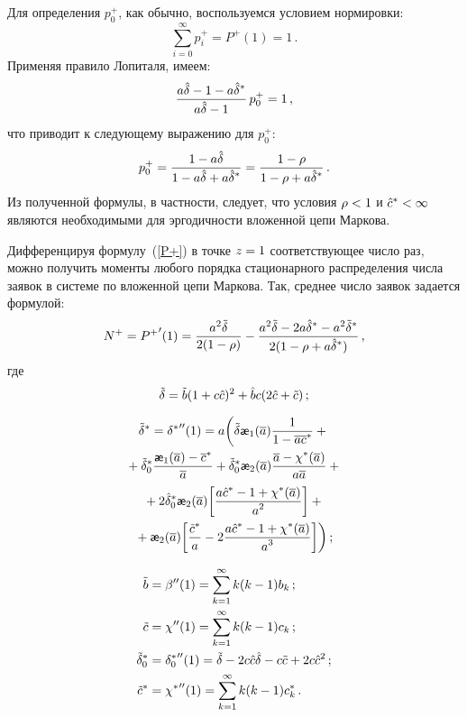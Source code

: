 \begin{multicols}{2}
Для определения $p^{+}_{0}$, как обычно, воспользуемся условием
нормировки:
$$
\sum\limits_{i=0}^{\infty} p^{+}_{i}=P^{+}(1)=1\,.
$$
Применяя правило Лопиталя, имеем:
\begin{equation*}
\displaystyle\frac{\displaystyle a\hat \delta - 1 - a\hat \delta^{*} \mathstrut}{\displaystyle  a\hat \delta - 1\mathstrut}\, p^{+}_{0} = 1\,,
\end{equation*}
что приводит к следующему выражению для $p^{+}_{0}$:
\begin{equation*}
\label{p0+}
p^{+}_{0} = \displaystyle\frac{\displaystyle 1-a\hat \delta \mathstrut}{\displaystyle 1-a\hat \delta+a \hat \delta^*\mathstrut} = \displaystyle\frac{\displaystyle 1-\rho \mathstrut}{\displaystyle 1-\rho+a\hat \delta^*\mathstrut}\,.
\end{equation*}
Из полученной формулы, в частности, следует, что условия
$\rho \hm<1$ и $\hc^*\hm<\infty$ являются необходимыми
для эргодичности вложенной цепи Маркова.

Дифференцируя формулу~(\ref{P+}) в точке $z\hm=1$
соответствующее число раз, можно получить моменты любого
порядка стационарного распределения чис\-ла заявок в системе
по вложенной цепи Маркова.
Так, среднее число заявок задается формулой:
\begin{equation*}
N^+ = {P^{+}}'(1) = \displaystyle\frac{\displaystyle a^2\tilde \delta \mathstrut}{\displaystyle 2(1 - \rho)\mathstrut}
- \displaystyle\frac{\displaystyle  a^2\tilde \delta  - 2a\hat \delta^*-a^2\tilde \delta^*\mathstrut}{\displaystyle 2(1 - \rho + a \hat \delta^*)\mathstrut}\,,
\end{equation*}
где
$$
\tilde \delta = \tilde b (1 + c \hat c)^2 + \hat b c(2\hat c+\tilde c)\,;
$$

\vspace*{-12pt}

\noindent
\begin{multline*}
\td^* = {\delta^*}''(1) = a \bigg(
\td {\slae}_{1}(\a) \fr{1}{1 - \a \oc^*}
+ {}\\
{}+\td_0^* \fr{{\slae}_{1}(\a) - \oc^* }{\a}
+ \td_0^* {\slae}_{2}(\a) \fr{\a - \chi^*(\a) }{a \a}
+ {}\\
{}+
2{\hd^*_0} {\slae}_{2}(\a) \bigg[
\fr{a \hc^* - 1 + \chi^*(\a) }{a^2} \bigg]
+ {}\\
{}+{\slae}_{2}(\a) \bigg[
\fr{\tc^* }{a}
- 2\fr{a \hc^* - 1 + \chi^*(\a) }{a^3}
\bigg] \bigg)
\,;
\end{multline*}

\vspace*{-6pt}

\noindent
\begin{align*}
\tilde b &= \beta''(1) = \sum\limits_{k=1}^{\infty} k (k-1) b_k\,;
\\
\tilde c &= \chi''(1)  = \sum_{k=1}^{\infty} k (k-1) c_k\,;
\\
\tilde \delta^*_0 &= {\delta_0^*}''(1) = \tilde \delta - 2 c\hat c \hat \delta - c\tilde c + 2 c \hat c^2 \,;
\\
\tilde c^* &= {\chi^*}''(1) = \sum_{k=1}^{\infty} k (k-1) c^*_k\,.
\end{align*}


\end{multicols}

